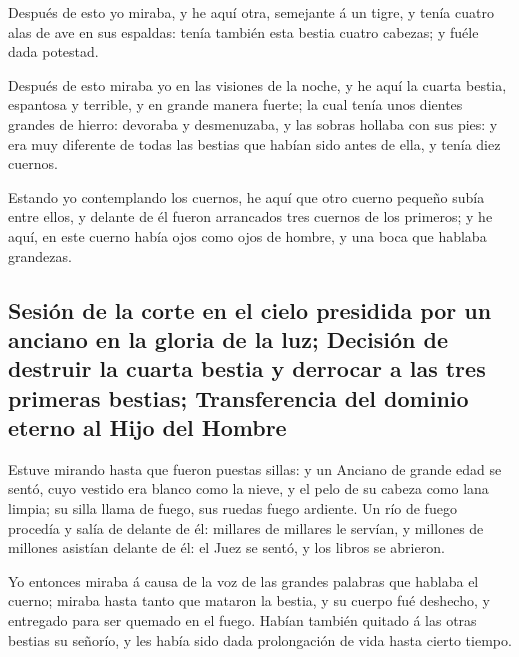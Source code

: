  Después de esto yo miraba, y he aquí otra, semejante á un
tigre, y tenía cuatro alas de ave en sus espaldas: tenía también esta
bestia cuatro cabezas; y fuéle dada potestad.

 Después de esto miraba yo en las visiones de la noche, y
he aquí la cuarta bestia, espantosa y terrible, y en grande manera
fuerte; la cual tenía unos dientes grandes de hierro: devoraba y
desmenuzaba, y las sobras hollaba con sus pies: y era muy diferente de
todas las bestias que habían sido antes de ella, y tenía diez cuernos.

 Estando yo contemplando los cuernos, he aquí que otro
cuerno pequeño subía entre ellos, y delante de él fueron arrancados tres
cuernos de los primeros; y he aquí, en este cuerno había ojos como ojos
de hombre, y una boca que hablaba grandezas.

\hypertarget{sesiuxf3n-de-la-corte-en-el-cielo-presidida-por-un-anciano-en-la-gloria-de-la-luz-decisiuxf3n-de-destruir-la-cuarta-bestia-y-derrocar-a-las-tres-primeras-bestias-transferencia-del-dominio-eterno-al-hijo-del-hombre}{%
\subsection{Sesión de la corte en el cielo presidida por un anciano en
la gloria de la luz; Decisión de destruir la cuarta bestia y derrocar a
las tres primeras bestias; Transferencia del dominio eterno al Hijo del
Hombre}\label{sesiuxf3n-de-la-corte-en-el-cielo-presidida-por-un-anciano-en-la-gloria-de-la-luz-decisiuxf3n-de-destruir-la-cuarta-bestia-y-derrocar-a-las-tres-primeras-bestias-transferencia-del-dominio-eterno-al-hijo-del-hombre}}

 Estuve mirando hasta que fueron puestas sillas: y un
Anciano de grande edad se sentó, cuyo vestido era blanco como la nieve,
y el pelo de su cabeza como lana limpia; su silla llama de fuego, sus
ruedas fuego ardiente.  Un río de fuego procedía y salía
de delante de él: millares de millares le servían, y millones de
millones asistían delante de él: el Juez se sentó, y los libros se
abrieron.

 Yo entonces miraba á causa de la voz de las grandes
palabras que hablaba el cuerno; miraba hasta tanto que mataron la
bestia, y su cuerpo fué deshecho, y entregado para ser quemado en el
fuego.  Habían también quitado á las otras bestias su
señorío, y les había sido dada prolongación de vida hasta cierto tiempo.

